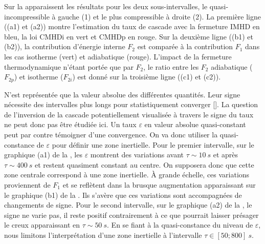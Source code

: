 Sur la  apparaissent les résultats pour les deux sous-intervalles, le quasi-incompressible à gauche (1) et le plus compressible à droite (2). La première ligne ((a1) et (a2)) montre l'estimation du taux de cascade avec la fermeture IMHD en bleu, la loi CMHDi en vert et CMHDp en rouge. Sur la deuxième ligne ((b1) et (b2)), la contribution d'énergie interne $F_2$ est comparée à la contribution $F_1$ dans les cas isotherme (vert) et adiabatique (rouge). L'impact de la fermeture thermodynamique n'étant portée que par $F_2$, le ratio entre les $F_2$ adiabatique ($F_{2p}$) et isotherme ($F_{2i}$) est donné sur la troisième ligne ((c1) et (c2)).

N'est représentée que la valeur absolue des différentes quantités. Leur signe nécessite des intervalles plus longs pour statistiquement converger [\cite{coburn_third-moment_2015,hadid_energy_2017}]. La question de l'inversion de la cascade potentiellement visualisée à travers le signe du taux ne peut donc pas être étudiée ici. Un taux $\varepsilon$ en valeur absolue quasi-constant peut par contre témoigner d'une convergence. On va donc utiliser la quasi-constance de $\varepsilon$ pour définir une zone inertielle. Pour le premier intervalle, sur le graphique (a1) de la , les $\varepsilon$ montrent des variations avant $\tau \sim \SI{10}{s}$ et après  $\tau \sim \SI{400}{s}$ et restent quasiment constant au centre. On supposera donc que cette zone centrale correspond à une zone inertielle. À grande échelle, ces variations proviennent de $F_1$ et se reflètent dans la brusque augmentation apparaissant sur le graphique (b1) de la . Ils s'avère que ces variations sont accompagnées de changements de signe. Pour le second intervalle, sur le graphique (a2) de la , le signe ne varie pas, il reste positif contrairement à ce que pourrait laisser présager le creux apparaissant en $\tau \sim \SI{50}{s}$. En se fiant à la quasi-constance du niveau de $\varepsilon$, nous limitons l'interprétation d'une zone inertielle à l'intervalle $\tau \in [50;800]\SI{}{s}$. 

